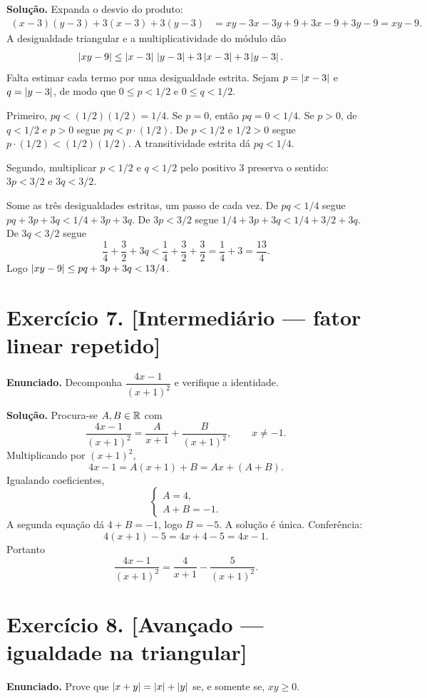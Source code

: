 \documentclass[11pt,a4paper]{article}
\begin{document}
\textbf{Solução.}
Expanda o desvio do produto:
\begin{align*}
(x-3)(y-3)+3(x-3)+3(y-3)
&=xy-3x-3y+9+3x-9+3y-9
=xy-9.
\end{align*}
A desigualdade triangular e a multiplicatividade do módulo dão
\begin{align*}
\left\lvert xy-9 \right\rvert
&\le\left\lvert x-3 \right\rvert\,\left\lvert y-3 \right\rvert+3\left\lvert x-3 \right\rvert+3\left\lvert y-3 \right\rvert.
\end{align*}
Falta estimar cada termo por uma desigualdade estrita. Sejam $p=\left\lvert x-3 \right\rvert$ e $q=\left\lvert y-3 \right\rvert$, de modo que $0\le p<1/2$ e $0\le q<1/2$.

Primeiro, $pq<(1/2)(1/2)=1/4$. Se $p=0$, então $pq=0<1/4$. Se $p>0$, de $q<1/2$ e $p>0$ segue $pq<p\cdot(1/2)$. De $p<1/2$ e $1/2>0$ segue $p\cdot(1/2)<(1/2)(1/2)$. A transitividade estrita dá $pq<1/4$.

Segundo, multiplicar $p<1/2$ e $q<1/2$ pelo positivo $3$ preserva o sentido: $3p<3/2$ e $3q<3/2$.

Some as três desigualdades estritas, um passo de cada vez. De $pq<1/4$ segue $pq+3p+3q<1/4+3p+3q$. De $3p<3/2$ segue $1/4+3p+3q<1/4+3/2+3q$. De $3q<3/2$ segue
\[
\frac14+\frac32+3q<\frac14+\frac32+\frac32=\frac14+3=\frac{13}{4}.
\]
Logo $\left\lvert xy-9 \right\rvert\le pq+3p+3q<13/4$.

\section*{Exercício 7. [Intermediário --- fator linear repetido]}

\textbf{Enunciado.} Decomponha $\dfrac{4x-1}{(x+1)^2}$ e verifique a identidade.

\textbf{Solução.}
Procura-se $A,B\in\mathbb{R}$ com
\[
\frac{4x-1}{(x+1)^2}=\frac{A}{x+1}+\frac{B}{(x+1)^2},\qquad x\neq -1.
\]
Multiplicando por $(x+1)^2$,
\[
4x-1=A(x+1)+B=Ax+(A+B).
\]
Igualando coeficientes,
\[
\begin{cases}
A=4,\\
A+B=-1.
\end{cases}
\]
A segunda equação dá $4+B=-1$, logo $B=-5$. A solução é única. Conferência:
\[
4(x+1)-5=4x+4-5=4x-1.
\]
Portanto
\[
\frac{4x-1}{(x+1)^2}=\frac{4}{x+1}-\frac{5}{(x+1)^2}.
\]

\section*{Exercício 8. [Avançado --- igualdade na triangular]}

\textbf{Enunciado.} Prove que $\left\lvert x+y \right\rvert=\left\lvert x \right\rvert+\left\lvert y \right\rvert$ se, e somente se, $xy\ge 0$.
\end{document}
